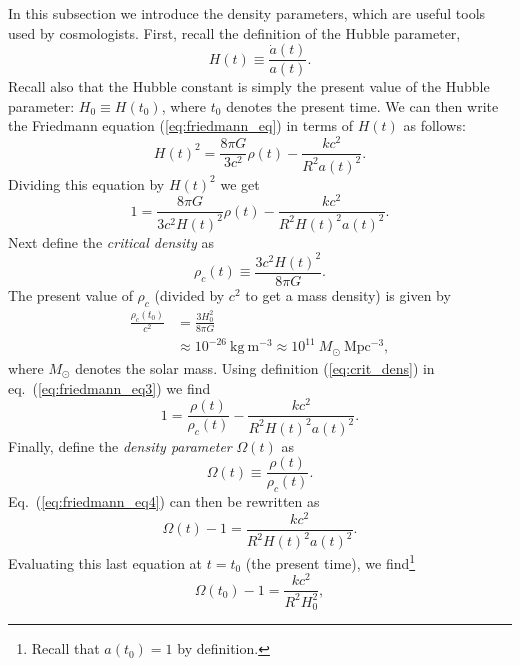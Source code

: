 \documentclass[11pt, a4paper,oneside,openright]{book}
\numberwithin{equation}{section}
\begin{document}
In this subsection we introduce the density parameters, which are useful tools used by cosmologists. First, recall the definition of the Hubble parameter,
\begin{equation}
H(t)\equiv \frac{\dot{a}(t)}{a(t)}.
\end{equation}
Recall also that the Hubble constant is simply the present value of the Hubble parameter: $H_0\equiv H(t_0)$, where $t_0$ denotes the present time. We can then write the Friedmann equation (\ref{eq:friedmann_eq}) in terms of $H(t)$ as follows:
\begin{equation}
H(t)^2= \frac{8\pi G}{3c^2}\rho(t)-\frac{kc^2}{R^2a(t)^2}.
\end{equation}
Dividing this equation by $H(t)^2$ we get
\begin{equation} \label{eq:friedmann_eq3}
1= \frac{8\pi G}{3c^2H(t)^2}\rho(t)-\frac{kc^2}{R^2H(t)^2a(t)^2}.
\end{equation}
Next define the {\it critical density} as
\begin{equation} \label{eq:crit_dens}
\rho_c(t)\equiv \frac{3c^2H(t)^2}{8\pi G}.
\end{equation}
The present value of $\rho_c$ (divided by $c^2$ to get a mass density) is given by
\begin{equation}
\begin{split}
\frac{\rho_c(t_0)}{c^2}&=\frac{3H_0^2}{8\pi G}\\
&\approx 10^{-26}~\mathrm{kg~m^{-3}}\approx 10^{11}~M_{\odot}~\mathrm{Mpc^{-3}},
\end{split}
\end{equation}
where $M_{\odot}$ denotes the solar mass. Using definition (\ref{eq:crit_dens}) in eq.\ (\ref{eq:friedmann_eq3}) we find
\begin{equation} \label{eq:friedmann_eq4}
1=\frac{\rho(t)}{\rho_c(t)}-\frac{kc^2}{R^2H(t)^2a(t)^2}.
\end{equation}
Finally, define the {\it density parameter} $\Omega(t)$ as
\begin{equation}
\Omega(t)\equiv \frac{\rho(t)}{\rho_c(t)}.
\end{equation}
Eq.\ (\ref{eq:friedmann_eq4}) can then be rewritten as
\begin{equation}
\Omega(t)-1=\frac{kc^2}{R^2H(t)^2a(t)^2}.
\end{equation}
Evaluating this last equation at $t=t_0$ (the present time), we find\footnote{Recall that $a(t_0)=1$ by definition.}
\begin{equation}
\Omega(t_0)-1=\frac{kc^2}{R^2H_0^2},
\end{equation}
\end{document}
